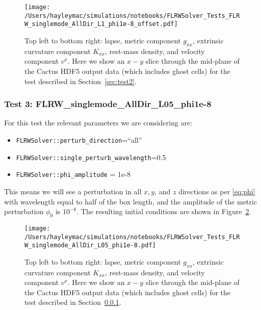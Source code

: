 \begin{figure}[ht]
	\begin{center}
	   \texttt{[image: /Users/hayleymac/simulations/notebooks/FLRWSolver\_Tests\_FLRW\_singlemode\_AllDir\_L1\_phi1e-8\_offset.pdf]}
	\end{center}
	\caption{Top left to bottom right: lapse, metric component $g_{xx}$, extrinsic curvature component $K_{xx}$, rest-mass density, and velocity component $v^x$. Here we show an $x-y$ slice through the mid-plane of the Cactus HDF5 output data (which includes ghost cells) for the test described in Section~\ref{sec:test2}.}
	\label{fig:test2}
\end{figure}


\subsubsection{Test 3: FLRW\_singlemode\_AllDir\_L05\_phi1e-8} \label{sec:test3}

For this test the relevant parameters we are considering are:

\begin{itemize}
	\item \texttt{FLRWSolver::perturb\_direction}=``all''
	\item \texttt{FLRWSolver::single\_perturb\_wavelength}=0.5
	\item \texttt{FLRWSolver::phi\_amplitude} = 1e-8
\end{itemize}
This means we will see a perturbation in all $x,y$, and $z$ directions as per \eqref{eq:phi} with wavelength equal to half of the box length, and the amplitude of the metric perturbation $\phi_0$ is $10^{-8}$. The resulting initial conditions are shown in Figure~\ref{fig:test3}.

\begin{figure}[ht]
	\begin{center}
	   \texttt{[image: /Users/hayleymac/simulations/notebooks/FLRWSolver\_Tests\_FLRW\_singlemode\_AllDir\_L05\_phi1e-8.pdf]}
	\end{center}
	\caption{Top left to bottom right: lapse, metric component $g_{xx}$, extrinsic curvature component $K_{xx}$, rest-mass density, and velocity component $v^x$. Here we show an $x-y$ slice through the mid-plane of the Cactus HDF5 output data (which includes ghost cells) for the test described in Section~\ref{sec:test3}.}
	\label{fig:test3}
\end{figure}


